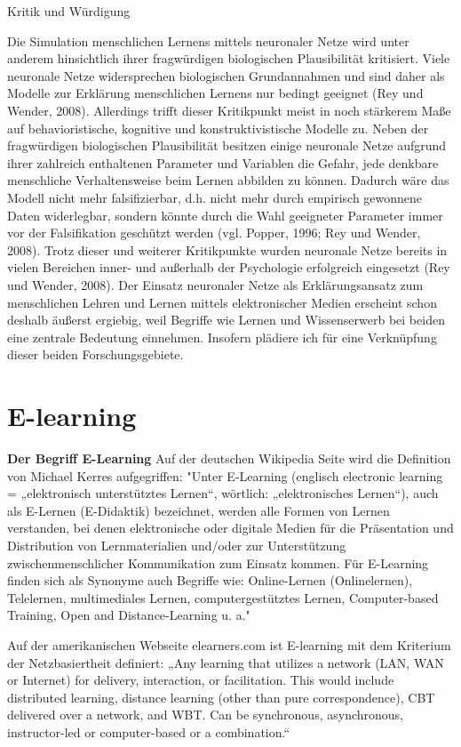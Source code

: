 \documentclass[a4paper, 12pt, twoside, BCOR=20mm, DIV=calc, abstracton, parskip=half*, toc=bibliography, toc=listof, headsepline, footsepline, headings=small, numbers=enddot]{scrreprt}
\begin{document}
Kritik und Würdigung

Die Simulation menschlichen Lernens mittels neuronaler Netze wird unter anderem hinsichtlich ihrer fragwürdigen biologischen Plausibilität kritisiert. Viele neuronale Netze widersprechen biologischen Grundannahmen und sind daher als Modelle zur Erklärung menschlichen Lernens nur bedingt geeignet (Rey und Wender, 2008). Allerdings trifft dieser Kritikpunkt meist in noch stärkerem Maße auf behavioristische, kognitive und konstruktivistische Modelle zu. Neben der fragwürdigen biologischen Plausibilität besitzen einige neuronale Netze aufgrund ihrer zahlreich enthaltenen Parameter und Variablen die Gefahr, jede denkbare menschliche Verhaltensweise beim Lernen abbilden zu können. Dadurch wäre das Modell nicht mehr falsifizierbar, d.h. nicht mehr durch empirisch gewonnene Daten widerlegbar, sondern könnte durch die Wahl geeigneter Parameter immer vor der Falsifikation geschützt werden (vgl. Popper, 1996; Rey und Wender, 2008). Trotz dieser und weiterer Kritikpunkte wurden neuronale Netze bereits in vielen Bereichen inner- und außerhalb der Psychologie erfolgreich eingesetzt (Rey und Wender, 2008). Der Einsatz neuronaler Netze als Erklärungsansatz zum menschlichen Lehren und Lernen mittels elektronischer Medien erscheint schon deshalb äußerst ergiebig, weil Begriffe wie Lernen und Wissenserwerb bei beiden eine zentrale Bedeutung einnehmen. Insofern plädiere ich für eine Verknüpfung dieser beiden Forschungsgebiete.

\section{E-learning}
\textbf{Der Begriff E-Learning}
Auf der deutschen Wikipedia Seite wird die Definition von Michael Kerres aufgegriffen:
"Unter E-Learning (englisch electronic learning = „elektronisch unterstütztes Lernen“, wörtlich: „elektronisches Lernen“), auch als E-Lernen (E-Didaktik) bezeichnet, werden alle Formen von Lernen verstanden, bei denen elektronische oder digitale Medien für die Präsentation und Distribution von Lernmaterialien und/oder zur Unterstützung zwischenmenschlicher Kommunikation zum Einsatz kommen.
Für E-Learning finden sich als Synonyme auch Begriffe wie: Online-Lernen (Onlinelernen), Telelernen, multimediales Lernen, computergestütztes Lernen, Computer-based Training, Open and Distance-Learning u. a."\cite{kerres2005learning}

Auf der amerikanischen Webseite elearners.com  ist E-learning mit dem Kriterium der Netzbasiertheit definiert:
„Any learning that utilizes a network (LAN, WAN or Internet) for delivery, interaction,
or facilitation. This would include distributed learning, distance learning (other
than pure correspondence), CBT delivered over a network, and WBT. Can be synchronous,
asynchronous, instructor-led or computer-based or a combination.“\cite{aldrich2003simulations}
\end{document}
